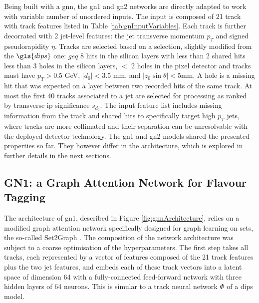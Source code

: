 Being built with a \gls{gnn}, the \gls{gn1} and \gls{gn2} networks are directly adapted to work with variable number of unordered inputs. The input is composed of 21 track with track features listed in Table \ref{tab:gnInputVariables}. Each track is further decorrated with 2 jet-level features: the jet transverse momentum $p_T$ and signed pseudorapidity $\eta$. Tracks are selected based on a selection, slightly modified from the $\gls{dips}$ one: $geq$ 8 hits in the silicon layers with less than 2 shared hits less than 3 holes in the silicon layers, $<$ 2 holes in the pixel detector and tracks must have $p_T > 0.5$ GeV, $|d_0| < 3.5$ mm, and $|z_0 \sin\theta| < 5$mm. A hole is a missing hit that was expected on a layer between two recorded hits of the same track. At most the first 40 tracks associated to a jet are selected for processing as ranked by transverse \gls{ip} significance $s_{d_0}$. The input feature list includes missing information from the track and shared hits to specifically target high $p_T$ jets, where tracks are more collimated and their separation can be unresolvable with the deployed detector technology. The \gls{gn1} and \gls{gn2} models shared the presented properties so far. They however differ in the architecture, which is explored in further details in the next sections. \\

\subsection{GN1: a Graph Attention Network for Flavour Tagging}\label{chap-GN1}
The architecture of \gls{gn1}, described in Figure \ref{fig:gnnArchitecture}, relies on a modified graph attention network \cite{brody2022how} specifically designed for graph learning on sets, the so-called Set2Graph \cite{serviansky2020set2graph}. The composition of the network architecture was subject to a coarse optimisation of the hyperparameters. The first step takes all tracks, each represented by a vector of features composed of the 21 track features plus the two jet features, and embeds each of these track vectors into a latent space of dimension 64 with a fully-connected feed-forward network with three hidden layers of 64 neurons. This is simular to a track neural network $\Phi$ of a \gls{dips} model. \\


